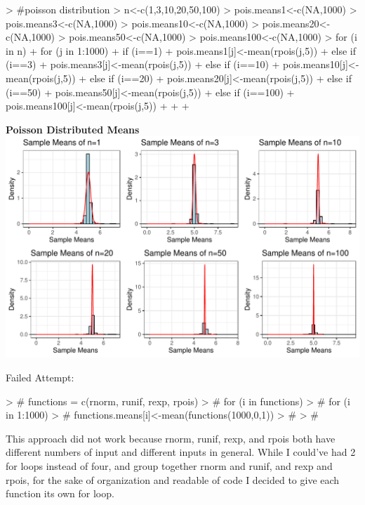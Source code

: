 \documentclass{article}
\begin{document}
\begin{enumerate}
\begin{enumerate}
\begin{Schunk}
\begin{Sinput}
> #poisson distribution
> n<-c(1,3,10,20,50,100)
> pois.means1<-c(NA,1000)
> pois.means3<-c(NA,1000)
> pois.means10<-c(NA,1000)
> pois.means20<-c(NA,1000)
> pois.means50<-c(NA,1000)
> pois.means100<-c(NA,1000)
> for (i in n){
+   for (j in 1:1000){
+     if (i==1){
+     pois.means1[j]<-mean(rpois(j,5))
+     } else if (i==3) {
+       pois.means3[j]<-mean(rpois(j,5))
+     } else if (i==10) {
+       pois.means10[j]<-mean(rpois(j,5))
+     } else if (i==20) {
+       pois.means20[j]<-mean(rpois(j,5))
+     } else if (i==50) {
+       pois.means50[j]<-mean(rpois(j,5))
+     } else if (i==100) {
+       pois.means100[j]<-mean(rpois(j,5))
+     }
+     
+ }}
\end{Sinput}
\end{Schunk}
\newpage
\textbf{Poisson Distributed Means}
\newline
\includegraphics{HW2-020}

Failed Attempt:
\begin{Schunk}
\begin{Sinput}
> # functions = c(rnorm, runif, rexp, rpois)
> # for (i in functions){
> #   for (i in 1:1000){
> #     functions.means[i]<-mean(functions(1000,0,1))
> #   }
> # }
\end{Sinput}
\end{Schunk}
This approach did not work because rnorm, runif, rexp, and rpois both have different numbers of input and different inputs in general. While I could've had 2 for loops instead of four, and group together rnorm and runif, and rexp and rpois, for the sake of organization and readable of code I decided to give each function its own for loop.


\end{enumerate}
\end{enumerate}
\end{document}
